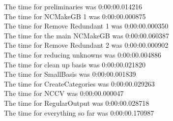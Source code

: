\documentclass[rep10,leqno]{report}
\begin{document}
\noindent
The time for preliminaries was 0:00:00.014216\\
The time for NCMakeGB 1 was 0:00:00.000875\\
The time for Remove Redundant 1 was 0:00:00.000350\\
The time for the main NCMakeGB was 0:00:00.060387\\
The time for Remove Redundant 2 was 0:00:00.000902\\
The time for reducing unknowns was 0:00:00.004886\\
The time for clean up basis was 0:00:00.021820\\
The time for SmallBasis was 0:00:00.001839\\
The time for CreateCategories was 0:00:00.029263\\
The time for NCCV was 0:00:00.000047\\
The time for RegularOutput was 0:00:00.028718\\
The time for everything so far was 0:00:00.170987\\
\end{document}
